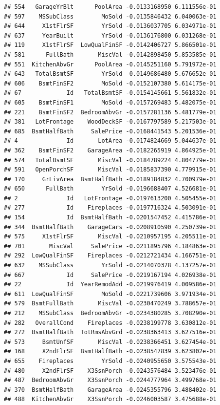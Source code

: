 \documentclass[american,]{article}
\theoremstyle{definition}
\theoremstyle{definition}
\theoremstyle{definition}
\theoremstyle{remark}
\begin{document}
\begin{verbatim}
## 554   GarageYrBlt      PoolArea -0.0133168950 6.111556e-01
## 597    MSSubClass        MoSold -0.0135846432 6.040063e-01
## 644     X1stFlrSF        YrSold -0.0136037705 6.034971e-01
## 637     YearBuilt        YrSold -0.0136176800 6.031268e-01
## 119     X1stFlrSF  LowQualFinSF -0.0142406727 5.866501e-01
## 581      FullBath       MiscVal -0.0142898450 5.853585e-01
## 551  KitchenAbvGr      PoolArea -0.0145251160 5.791972e-01
## 643   TotalBsmtSF        YrSold -0.0149686480 5.676652e-01
## 606    BsmtFinSF2        MoSold -0.0152107380 5.614175e-01
## 67             Id   TotalBsmtSF -0.0154145661 5.561832e-01
## 605    BsmtFinSF1        MoSold -0.0157269483 5.482075e-01
## 221    BsmtFinSF2  BedroomAbvGr -0.0157281136 5.481779e-01
## 381   LotFrontage    WoodDeckSF -0.0167797589 5.217503e-01
## 685  BsmtHalfBath     SalePrice -0.0168441543 5.201536e-01
## 4              Id       LotArea -0.0174824669 5.044637e-01
## 362    BsmtFinSF2    GarageArea -0.0182265919 4.864925e-01
## 574   TotalBsmtSF       MiscVal -0.0184789224 4.804779e-01
## 591   OpenPorchSF       MiscVal -0.0185837390 4.779915e-01
## 170     GrLivArea  BsmtHalfBath -0.0189184832 4.700979e-01
## 650      FullBath        YrSold -0.0196688407 4.526681e-01
## 2              Id   LotFrontage -0.0197613200 4.505455e-01
## 277            Id    Fireplaces -0.0197716324 4.503091e-01
## 154            Id  BsmtHalfBath -0.0201547452 4.415786e-01
## 344  BsmtHalfBath    GarageCars -0.0208910590 4.250739e-01
## 575     X1stFlrSF       MiscVal -0.0210957195 4.205511e-01
## 701       MiscVal     SalePrice -0.0211895796 4.184863e-01
## 292  LowQualFinSF    Fireplaces -0.0212721434 4.166751e-01
## 632    MSSubClass        YrSold -0.0214070378 4.137257e-01
## 667            Id     SalePrice -0.0219167194 4.026938e-01
## 22             Id  YearRemodAdd -0.0219976419 4.009586e-01
## 611  LowQualFinSF        MoSold -0.0221739606 3.971934e-01
## 579  BsmtFullBath       MiscVal -0.0230470249 3.788657e-01
## 212    MSSubClass  BedroomAbvGr -0.0234380285 3.708290e-01
## 282   OverallCond    Fireplaces -0.0238199778 3.630812e-01
## 272  BsmtHalfBath  TotRmsAbvGrd -0.0238363413 3.627516e-01
## 573     BsmtUnfSF       MiscVal -0.0238366451 3.627454e-01
## 168     X2ndFlrSF  BsmtHalfBath -0.0238547839 3.623802e-01
## 655    Fireplaces        YrSold -0.0240955650 3.575543e-01
## 480     X2ndFlrSF    X3SsnPorch -0.0243576484 3.523476e-01
## 487  BedroomAbvGr    X3SsnPorch -0.0244777964 3.499768e-01
## 370  BsmtHalfBath    GarageArea -0.0245355796 3.488402e-01
## 488  KitchenAbvGr    X3SsnPorch -0.0246003587 3.475688e-01

\end{verbatim}
\end{document}
